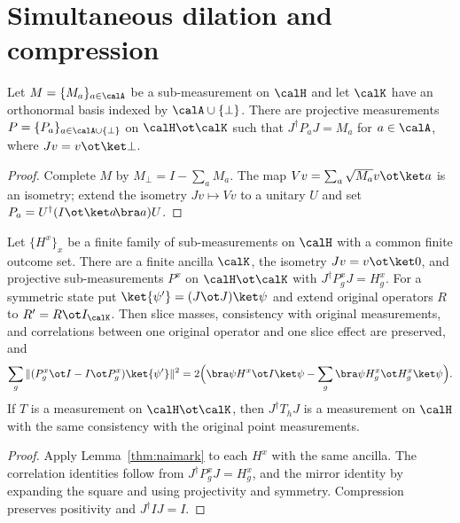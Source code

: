 \section{Simultaneous dilation and compression}
\label{sec:self-improvement-dilation}

\begin{lemma}\label{thm:naimark}
	\leanok
	Let $M=\{M_a\}_{a\in\calA}$ be a sub-measurement on $\calH$ and let
	$\calK$ have an orthonormal basis indexed by $\calA\cup\{\bot\}$.  There
	are projective measurements $P=\{P_a\}_{a\in\calA\cup\{\bot\}}$ on
	$\calH\ot\calK$ such that $J^\dagger P_aJ=M_a$ for $a\in\calA$, where
	$Jv=v\ot\ket\bot$.
\end{lemma}
\begin{proof}
	\leanok
	Complete $M$ by $M_\bot=I-\sum_aM_a$.  The map
	$V v=\sum_a\sqrt{M_a}v\ot\ket a$ is an isometry; extend the isometry
	$Jv\mapsto Vv$ to a unitary $U$ and set
	$P_a=U^\dagger(I\ot\ket a\!\bra a)U$.
\end{proof}

\begin{lemma}\label{lem:simultaneous-dilation-compression}
	\leanok
	Let $\{H^x\}_x$ be a finite family of sub-measurements on $\calH$ with a
	common finite outcome set.  There are a finite ancilla $\calK$, the
	isometry $Jv=v\ot\ket0$, and projective sub-measurements $P^x$ on
	$\calH\ot\calK$ with $J^\dagger P^x_gJ=H^x_g$.  For a symmetric state put
	$\ket{\psi'}=(J\ot J)\ket\psi$ and extend original operators $R$ to
	$R'=R\ot I_\calK$.  Then slice masses, consistency with original
	measurements, and correlations between one original operator and one
	slice effect are preserved, and
	\[
		\sum_g\|(P^x_g\ot I-I\ot P^x_g)\ket{\psi'}\|^2
		=2\Bigl(\bra\psi H^x\ot I\ket\psi-\sum_g\bra\psi H^x_g\ot H^x_g\ket\psi\Bigr).
	\]
	If $T$ is a measurement on $\calH\ot\calK$, then $J^\dagger T_hJ$ is a
	measurement on $\calH$ with the same consistency with the original point
	measurements.
\end{lemma}
\begin{proof}
	\leanok
	Apply Lemma~\ref{thm:naimark} to each $H^x$ with the same ancilla.  The
	correlation identities follow from $J^\dagger P^x_gJ=H^x_g$, and the mirror
	identity by expanding the square and using projectivity and symmetry.
	Compression preserves positivity and $J^\dagger IJ=I$.
\end{proof}

